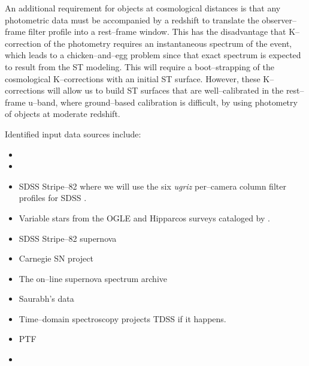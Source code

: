 An additional requirement for objects at cosmological distances is that any
photometric data must be accompanied by a redshift to translate the
observer--frame filter profile into a rest--frame window. This has the
disadvantage that K--correction of the photometry \citep{2002astro.ph.10394H}
requires an instantaneous spectrum of the event, which leads to a
chicken--and--egg problem since that exact spectrum is expected to result from
the ST modeling.  This will require a boot--strapping of the cosmological
K--corrections with an initial ST surface.  However, these K--corrections will
allow us to build ST surfaces that are well--calibrated in the rest--frame
u--band, where ground--based calibration is difficult, by using photometry of
objects at moderate redshift.

Identified input data sources include:

\begin{itemize}


\item {}

\item {}

\item SDSS Stripe--82 where we will use the six {\it ugriz} per--camera column
filter profiles for SDSS \citep{2007AJ....134..973I}.

\item Variable stars from the OGLE and Hipparcos surveys cataloged by
\cite{2007A&A...475.1159D}.


\item SDSS Stripe--82 supernova

\item Carnegie SN project

\item The on--line supernova spectrum archive

\item Saurabh's data 

\item Time--domain spectroscopy projects TDSS if it happens.


\item PTF

\item {}

\end{itemize}


